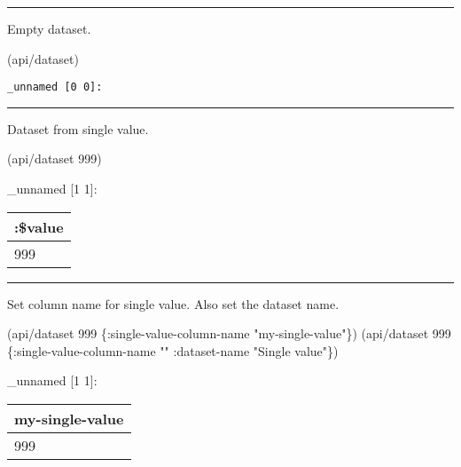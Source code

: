\documentclass[]{article}
\newenvironment{Shaded}{\begin{snugshade}}{\end{snugshade}}
\newcommand{\DecValTok}[1]{\textcolor[rgb]{0.00,0.00,0.81}{#1}}
\newcommand{\StringTok}[1]{\textcolor[rgb]{0.31,0.60,0.02}{#1}}
\newcommand{\AttributeTok}[1]{\textcolor[rgb]{0.77,0.63,0.00}{#1}}
\newcommand{\NormalTok}[1]{#1}
\begin{document}
\begin{center}\rule{0.5\linewidth}{0.5pt}\end{center}

Empty dataset.

\begin{Shaded}
\begin{Highlighting}[]
\NormalTok{(api/dataset)}
\end{Highlighting}
\end{Shaded}

\begin{verbatim}
_unnamed [0 0]:
\end{verbatim}

\begin{center}\rule{0.5\linewidth}{0.5pt}\end{center}

Dataset from single value.

\begin{Shaded}
\begin{Highlighting}[]
\NormalTok{(api/dataset }\DecValTok{999}\NormalTok{)}
\end{Highlighting}
\end{Shaded}

\_unnamed {[}1 1{]}:

\begin{longtable}[]{@{}l@{}}
\toprule
:\$value\tabularnewline
\midrule
\endhead
999\tabularnewline
\bottomrule
\end{longtable}

\begin{center}\rule{0.5\linewidth}{0.5pt}\end{center}

Set column name for single value. Also set the dataset name.

\begin{Shaded}
\begin{Highlighting}[]
\NormalTok{(api/dataset }\DecValTok{999}\NormalTok{ \{}\AttributeTok{:single-value-column-name} \StringTok{"my-single-value"}\NormalTok{\})}
\NormalTok{(api/dataset }\DecValTok{999}\NormalTok{ \{}\AttributeTok{:single-value-column-name} \StringTok{""}
                  \AttributeTok{:dataset-name} \StringTok{"Single value"}\NormalTok{\})}
\end{Highlighting}
\end{Shaded}

\_unnamed {[}1 1{]}:

\begin{longtable}[]{@{}l@{}}
\toprule
my-single-value\tabularnewline
\midrule
\endhead
999\tabularnewline
\bottomrule
\end{longtable}
\end{document}
